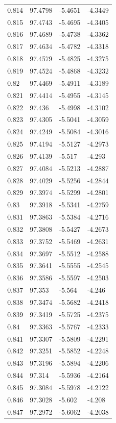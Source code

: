 \begin{tabular}{llll}
0.814 & 97.4798 & -5.4651 & -4.3449 \\
0.815 & 97.4743 & -5.4695 & -4.3405 \\
0.816 & 97.4689 & -5.4738 & -4.3362 \\
0.817 & 97.4634 & -5.4782 & -4.3318 \\
0.818 & 97.4579 & -5.4825 & -4.3275 \\
0.819 & 97.4524 & -5.4868 & -4.3232 \\
0.82 & 97.4469 & -5.4911 & -4.3189 \\
0.821 & 97.4414 & -5.4955 & -4.3145 \\
0.822 & 97.436 & -5.4998 & -4.3102 \\
0.823 & 97.4305 & -5.5041 & -4.3059 \\
0.824 & 97.4249 & -5.5084 & -4.3016 \\
0.825 & 97.4194 & -5.5127 & -4.2973 \\
0.826 & 97.4139 & -5.517 & -4.293 \\
0.827 & 97.4084 & -5.5213 & -4.2887 \\
0.828 & 97.4029 & -5.5256 & -4.2844 \\
0.829 & 97.3974 & -5.5299 & -4.2801 \\
0.83 & 97.3918 & -5.5341 & -4.2759 \\
0.831 & 97.3863 & -5.5384 & -4.2716 \\
0.832 & 97.3808 & -5.5427 & -4.2673 \\
0.833 & 97.3752 & -5.5469 & -4.2631 \\
0.834 & 97.3697 & -5.5512 & -4.2588 \\
0.835 & 97.3641 & -5.5555 & -4.2545 \\
0.836 & 97.3586 & -5.5597 & -4.2503 \\
0.837 & 97.353 & -5.564 & -4.246 \\
0.838 & 97.3474 & -5.5682 & -4.2418 \\
0.839 & 97.3419 & -5.5725 & -4.2375 \\
0.84 & 97.3363 & -5.5767 & -4.2333 \\
0.841 & 97.3307 & -5.5809 & -4.2291 \\
0.842 & 97.3251 & -5.5852 & -4.2248 \\
0.843 & 97.3196 & -5.5894 & -4.2206 \\
0.844 & 97.314 & -5.5936 & -4.2164 \\
0.845 & 97.3084 & -5.5978 & -4.2122 \\
0.846 & 97.3028 & -5.602 & -4.208 \\
0.847 & 97.2972 & -5.6062 & -4.2038 \\

\end{tabular}
